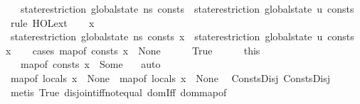 \begin{isabellebody}
\ \ \ {\isachardoublequoteopen}state{\isacharunderscore}{\kern0pt}restriction\ {\isacharparenleft}{\kern0pt}global{\isacharunderscore}{\kern0pt}state\ ns{\isacharparenright}{\kern0pt}\ consts\ {\isacharequal}{\kern0pt}\ state{\isacharunderscore}{\kern0pt}restriction\ {\isacharparenleft}{\kern0pt}global{\isacharunderscore}{\kern0pt}state\ u{\isacharparenright}{\kern0pt}\ consts{\isachardoublequoteclose}\ \ \isanewline
%
\isadelimproof
%
\endisadelimproof
%
\isatagproof
{}\isamarkupfalse%
\ {\isacharparenleft}{\kern0pt}rule\ HOL{\isachardot}{\kern0pt}ext{\isacharparenright}{\kern0pt}\isanewline
\ \ \isamarkupfalse%
\ x\isanewline
\ \ \isamarkupfalse%
\ {\isachardoublequoteopen}state{\isacharunderscore}{\kern0pt}restriction\ {\isacharparenleft}{\kern0pt}global{\isacharunderscore}{\kern0pt}state\ ns{\isacharparenright}{\kern0pt}\ consts\ x\ {\isacharequal}{\kern0pt}\ state{\isacharunderscore}{\kern0pt}restriction\ {\isacharparenleft}{\kern0pt}global{\isacharunderscore}{\kern0pt}state\ u{\isacharparenright}{\kern0pt}\ consts\ x{\isachardoublequoteclose}\isanewline
\ \ \isamarkupfalse%
\ {\isacharparenleft}{\kern0pt}cases\ {\isachardoublequoteopen}map{\isacharunderscore}{\kern0pt}of\ consts\ x\ {\isasymnoteq}\ None{\isachardoublequoteclose}{\isacharparenright}{\kern0pt}\isanewline
\ \ \ \ \isamarkupfalse%
\ True\isanewline
\ \ \ \ \isamarkupfalse%
\ this\ \isamarkupfalse%
\ {\isasymtau}\ \ {\isachardoublequoteopen}map{\isacharunderscore}{\kern0pt}of\ consts\ x\ {\isacharequal}{\kern0pt}\ Some\ {\isasymtau}{\isachardoublequoteclose}\ \isamarkupfalse%
\ auto\isanewline
\ \ \ \ \isamarkupfalse%
\ \isamarkupfalse%
\ {\isachardoublequoteopen}map{\isacharunderscore}{\kern0pt}of\ locals\ x\ {\isacharequal}{\kern0pt}\ None{\isachardoublequoteclose}\ \ {\isachardoublequoteopen}map{\isacharunderscore}{\kern0pt}of\ locals{}\ x\ {\isacharequal}{\kern0pt}\ None{\isachardoublequoteclose}\ \isamarkupfalse%
\ ConstsDisj\ ConstsDisj{}\isanewline
\ \ \ \ \ \ \isamarkupfalse%
\ {\isacharparenleft}{\kern0pt}metis\ True\ disjoint{\isacharunderscore}{\kern0pt}iff{\isacharunderscore}{\kern0pt}not{\isacharunderscore}{\kern0pt}equal\ domIff\ dom{\isacharunderscore}{\kern0pt}map{\isacharunderscore}{\kern0pt}of{\isacharunderscore}{\kern0pt}{}{\isacharparenright}{\kern0pt}{\isacharplus}{\kern0pt}\isanewline

\end{isabellebody}
